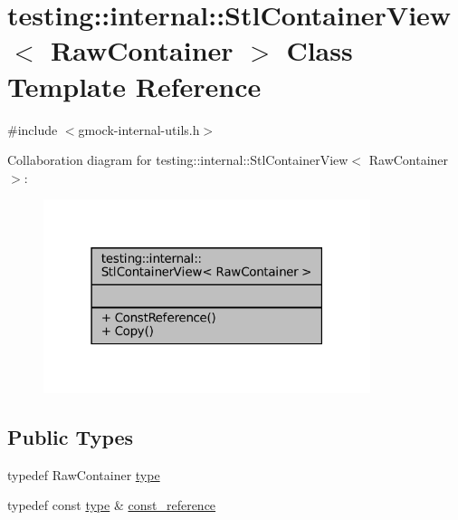 \hypertarget{classtesting_1_1internal_1_1StlContainerView}{}\section{testing\+:\+:internal\+:\+:Stl\+Container\+View$<$ Raw\+Container $>$ Class Template Reference}
\label{classtesting_1_1internal_1_1StlContainerView}


{\ttfamily \#include $<$gmock-\/internal-\/utils.\+h$>$}



Collaboration diagram for testing\+:\+:internal\+:\+:Stl\+Container\+View$<$ Raw\+Container $>$\+:
\nopagebreak
\begin{figure}[H]
\begin{center}
\leavevmode
\includegraphics[width=271pt]{classtesting_1_1internal_1_1StlContainerView__coll__graph}
\end{center}
\end{figure}
\subsection*{Public Types}
\begin{DoxyCompactItemize}
\item 
typedef Raw\+Container \hyperlink{classtesting_1_1internal_1_1StlContainerView_a2b2c63a6dcdbfe63fb0ee121ebf463ba}{type}
\item 
typedef const \hyperlink{classtesting_1_1internal_1_1StlContainerView_a2b2c63a6dcdbfe63fb0ee121ebf463ba}{type} \& \hyperlink{classtesting_1_1internal_1_1StlContainerView_a9cd4f6ed689b3938cdb7b3c4cbf1b36b}{const\+\_\+reference}
\end{DoxyCompactItemize}
